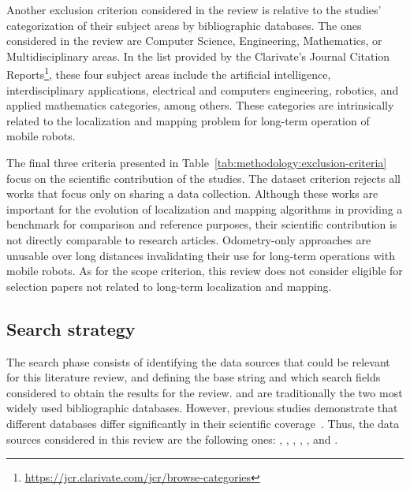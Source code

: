 \documentclass[10pt,a4paper,notitlepage,twocolumn,oneside]{article}
\begin{document}
Another exclusion criterion considered in the review is relative to the studies' categorization of their subject areas by bibliographic databases. The ones considered in the review are Computer Science, Engineering, Mathematics, or Multidisciplinary areas. In the list provided by the Clarivate's Journal Citation Reports\footnote{\url{https://jcr.clarivate.com/jcr/browse-categories}}, these four subject areas include the artificial intelligence, interdisciplinary applications, electrical and computers engineering, robotics, and applied mathematics categories, among others. These categories are intrinsically related to the localization and mapping problem for long-term operation of mobile robots.

The final three criteria presented in Table~\ref{tab:methodology:exclusion-criteria} focus on the scientific contribution of the studies. The dataset criterion rejects all works that focus only on sharing a data collection. Although these works are important for the evolution of localization and mapping algorithms in providing a benchmark for comparison and reference purposes, their scientific contribution is not directly comparable to research articles. Odometry-only approaches are unusable over long distances invalidating their use for long-term operations with mobile robots. As for the scope criterion, this review does not consider eligible for selection papers not related to long-term localization and mapping.

\subsection{Search strategy}
\label{sec:methodology:search}

The search phase consists of identifying the data sources that could be relevant for this literature review, and defining the base string and which search fields considered to obtain the results for the review.  and  are traditionally the two most widely used bibliographic databases. However, previous studies demonstrate that different databases differ significantly in their scientific coverage~\parencite{methodology:search:db:coverage:scopus-wos,methodology:search:db:coverage:dim-scopus-wos}. Thus, the data sources considered in this review are the following ones: , , , , , and .
\end{document}
